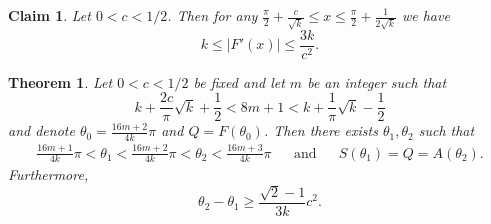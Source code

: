 \documentclass[10pt,a4paper]{amsart}
\newtheorem{theorem}{Theorem}
\newtheorem{claim}{Claim}
\begin{document}
\begin{claim}\label{cl:F'}
Let $ 0 < c < 1/2$. Then for any $\tfrac{\pi}{2}+\tfrac{c}{\sqrt{k}} \leq x \leq  \tfrac{\pi}{2} + \tfrac{1}{2\sqrt{k}}$ we have 
\[ k \leq |F'(x)| \leq \frac{3k}{c^2}.\]
\end{claim}

\begin{theorem}\label{thm:picktheta} Let $0<c<1/2$ be fixed and let $m$ be an integer such that 
\begin{equation}\label{eq:m_cond} 
k+\frac{2c}{\pi}\sqrt{k}+\frac{1}{2} < 8m+1 < k + \frac{1}{\pi}\sqrt{k}-\frac{1}{2}
\end{equation} 
and denote \(\theta_0 = \tfrac{16m+2}{4k}\pi\) and \(Q = F(\theta_0)\). Then there exists $\theta_1, \theta_2$ such that 
    \begin{align*}\frac{16m+1}{4k} \pi < \theta_1 < \frac{16m+2}{4k}\pi < \theta_2 < \frac{16m+3}{4k}\pi  && \mbox{and} && S(\theta_1)= Q = A(\theta_2).\end{align*}
Furthermore, \[\theta_2-\theta_1 \geq \frac{\sqrt{2}-1}{3k}c^2.\]
\end{theorem}
\end{document}
